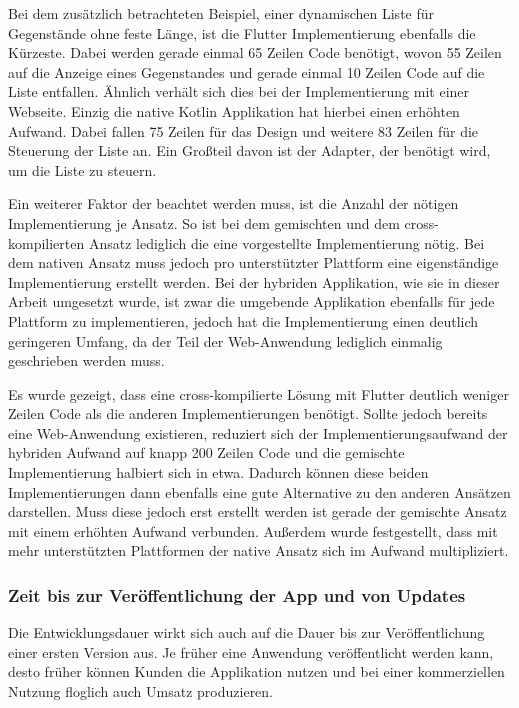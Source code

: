 Bei dem zusätzlich betrachteten Beispiel, einer dynamischen Liste für Gegenstände ohne feste Länge, ist die Flutter Implementierung ebenfalls die Kürzeste. Dabei werden gerade einmal 65 Zeilen Code benötigt, wovon 55 Zeilen auf die Anzeige eines Gegenstandes und gerade einmal 10 Zeilen Code auf die Liste entfallen. Ähnlich verhält sich dies bei der Implementierung mit einer Webseite. Einzig die native Kotlin Applikation hat hierbei einen erhöhten Aufwand. Dabei fallen 75 Zeilen für das Design und weitere 83 Zeilen für die Steuerung der Liste an. Ein Großteil davon ist der Adapter, der benötigt wird, um die Liste zu steuern. 

Ein weiterer Faktor der beachtet werden muss, ist die Anzahl der nötigen Implementierung je Ansatz. So ist bei dem gemischten und dem cross-kompilierten Ansatz lediglich die eine vorgestellte Implementierung nötig. Bei dem nativen Ansatz muss jedoch pro unterstützter Plattform eine eigenständige Implementierung erstellt werden. Bei der hybriden Applikation, wie sie in dieser Arbeit umgesetzt wurde, ist zwar die umgebende Applikation ebenfalls für jede Plattform zu implementieren, jedoch hat die Implementierung einen deutlich geringeren Umfang, da der Teil der Web-Anwendung lediglich einmalig geschrieben werden muss.  

Es wurde gezeigt, dass eine cross-kompilierte Lösung mit Flutter deutlich weniger Zeilen Code als die anderen Implementierungen benötigt.
Sollte jedoch bereits eine Web-Anwendung existieren, reduziert sich der Implementierungsaufwand der hybriden Aufwand auf knapp 200 Zeilen Code und die gemischte Implementierung halbiert sich in etwa. Dadurch können diese beiden Implementierungen dann ebenfalls eine gute Alternative zu den anderen Ansätzen darstellen. Muss diese jedoch erst erstellt werden ist gerade der gemischte Ansatz mit einem erhöhten Aufwand verbunden. Außerdem wurde festgestellt, dass mit mehr unterstützten Plattformen der native Ansatz sich im Aufwand multipliziert.

\subsubsection{Zeit bis zur Veröffentlichung der App und von Updates }
Die Entwicklungsdauer wirkt sich auch auf die Dauer bis zur Veröffentlichung einer ersten Version aus.
Je früher eine Anwendung veröffentlicht werden kann, desto früher können Kunden die Applikation nutzen und bei einer kommerziellen Nutzung floglich auch Umsatz produzieren.

